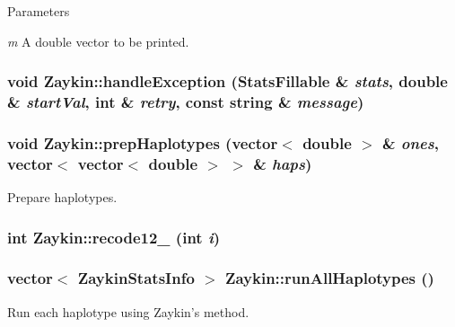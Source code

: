 \begin{DoxyParams}{Parameters}
\item[{\em m}]A double vector to be printed. \end{DoxyParams}
\hypertarget{classZaykin_aca4c79d7edc3bf5a62c73eb95d0ffb28}{
\subsubsection[{handleException}]{\setlength{\rightskip}{0pt plus 5cm}void Zaykin::handleException ({\bf StatsFillable} \& {\em stats}, \/  double \& {\em startVal}, \/  int \& {\em retry}, \/  const string \& {\em message})}}
\label{classZaykin_aca4c79d7edc3bf5a62c73eb95d0ffb28}
\hypertarget{classZaykin_a769d85be4c6a2e177db4ae826259b5a1}{
\subsubsection[{prepHaplotypes}]{\setlength{\rightskip}{0pt plus 5cm}void Zaykin::prepHaplotypes (vector$<$ double $>$ \& {\em ones}, \/  vector$<$ vector$<$ double $>$ $>$ \& {\em haps})}}
\label{classZaykin_a769d85be4c6a2e177db4ae826259b5a1}
Prepare haplotypes. \hypertarget{classZaykin_aaaee27a7e56db508adf3f2c9bb9229d4}{
\subsubsection[{recode12\_\-01}]{\setlength{\rightskip}{0pt plus 5cm}int Zaykin::recode12\_ (int {\em i})}}
\label{classZaykin_aaaee27a7e56db508adf3f2c9bb9229d4}
\hypertarget{classZaykin_af949cdfef60f62921b1128017c2dcc1d}{
\subsubsection[{runAllHaplotypes}]{\setlength{\rightskip}{0pt plus 5cm}vector$<$ {\bf ZaykinStatsInfo} $>$ Zaykin::runAllHaplotypes ()}}
\label{classZaykin_af949cdfef60f62921b1128017c2dcc1d}
Run each haplotype using Zaykin's method.

